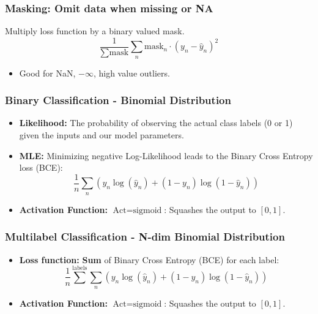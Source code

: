 \subsubsection{Masking: Omit data when missing or NA}
\begin{notes}
    Multiply loss function by a binary valued mask. 
    \begin{equation*}
        \frac{1}{\sum \text{mask}} \sum_n \text{mask}_n \cdot (y_n - \hat{y}_n)^2
    \end{equation*}
    \begin{itemize}
        \item Good for NaN, $-\infty$, high value outliers.
    \end{itemize}
\end{notes}

\subsubsection{Binary Classification - Binomial Distribution}
\begin{notes}
    \begin{itemize}
        \item \textbf{Likelihood:} The probability of observing the actual class labels (0 or 1) given the inputs and our model parameters.
        \item \textbf{MLE:} Minimizing negative Log-Likelihood leads to the Binary Cross Entropy loss (BCE):
        \[
        \frac{1}{n} \sum_n \left( y_n \log(\hat{y}_n) + (1 - y_n) \log(1 - \hat{y}_n) \right)
        \]
        \item \textbf{Activation Function:} $\text{Act} = \text{sigmoid}$: Squashes the output to $[0, 1].$
    \end{itemize}
\end{notes}

\subsubsection{Multilabel Classification - N-dim Binomial Distribution}
\begin{notes}
    \begin{itemize}
        \item \textbf{Loss function:} \textbf{Sum} of Binary Cross Entropy (BCE) for each label:
        \[
        \frac{1}{n} \sum^{\text{labels}} \sum_n \left( y_n \log(\hat{y}_n) + (1 - y_n) \log(1 - \hat{y}_n) \right)
        \]
        \item \textbf{Activation Function:} $\text{Act} = \text{sigmoid}$: Squashes the output to $[0, 1].$
    \end{itemize}
\end{notes}

